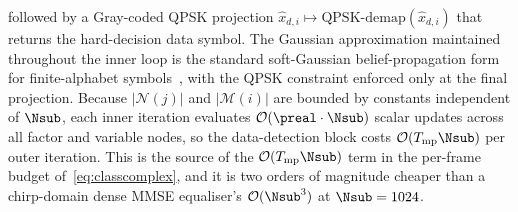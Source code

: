 followed by a Gray-coded QPSK projection $\hat{x}_{d,i} \mapsto \mathrm{QPSK\text{-}demap}(\hat{x}_{d,i})$ that returns the hard-decision data symbol. The Gaussian approximation maintained throughout the inner loop is the standard soft-Gaussian belief-propagation form for finite-alphabet symbols~\cite{wymeersch2007iterativereceiver}, with the QPSK constraint enforced only at the final projection. Because $|\mathcal{N}(j)|$ and $|\mathcal{M}(i)|$ are bounded by constants independent of $\Nsub$, each inner iteration evaluates $\mathcal{O}(\preal \cdot \Nsub)$ scalar updates across all factor and variable nodes, so the data-detection block costs $\mathcal{O}(T_\text{mp} \Nsub)$ per outer iteration. This is the source of the $\mathcal{O}(T_\text{mp} \Nsub)$ term in the per-frame budget of~\eqref{eq:classcomplex}, and it is two orders of magnitude cheaper than a chirp-domain dense MMSE equaliser's $\mathcal{O}(\Nsub^3)$ at $\Nsub = 1024$.
